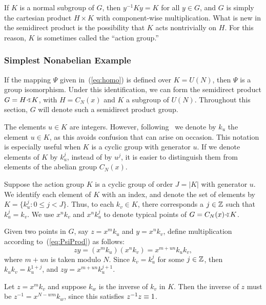 If $K$ is a normal subgroup of $G$,
then $y^{-1}Ky = K$ for all $y\in G$, 
and $G$ is simply the cartesian product $H\times K$ 
with component-wise multiplication. 
What is new in the semidirect product is
the possibility that $K$ acts nontrivially on $H$. 
For this reason, $K$ is sometimes called the ``action group.''

\subsubsection{Simplest Nonabelian Example}
If the mapping $\Psi$ given in~(\ref{eq:homo}) is defined over
$K=U(N)$, then $\Psi$ is a group isomorphism.
Under this identification, we can form the semidirect
product $G = H\sdp K$, with $H = C_N(x)$ and $K$ a
subgroup of $U(N)$.  Throughout this section, $G$ will
denote such a semidirect product group.

The elements $u\in K$ are integers. However, following~\cite{An:2003} we
denote by $k_u$ the element $u\in K$, as this avoids confusion that can arise 
on occasion. This notation is especially useful when $K$ 
is a cyclic group with generator $u$.  If  we denote elements of $K$ by $k_u^j$, instead of 
by $u^j$, it is easier to distinguish them from elements of the abelian group $C_N(x)$.

Suppose the action group $K$ is a cyclic group of order $J = |K|$ with generator
$u$. We identify each element of $K$ with an index, and denote 
the set of elements by $K = \{k_u^j: 0\leq j < J\}$.
Thus, to each $k_v \in K$, there corresponds a $j\in \mathbb{Z}$ 
such that $k_u^j=k_v$.
We use $x^n k_v$ and $x^n k_u^j$ to denote  
typical points of $G=C_N(x)\sdp K$.

Given two points in $G$, say $z = x^m k_u$
and $y=x^n k_v$, define multiplication %
according
to~(\ref{eq:PsiProd}) as follows:
\begin{equation}\label{eq:prod}
  zy = (x^m k_u)(x^n k_v) = x^{m+u n} k_u k_v,
\end{equation}
where %
$m+ u n$ is taken modulo $N$.
Since $k_v=k_u^j$ for some $j\in \mathbb{Z}$, then 
$k_u k_v = k_u^{1+j}$, and $zy = x^{m+u n} k_u^{j+1}$.

Let $z = x^m k_v$ and suppose $k_w$ is the inverse 
of $k_v$ in $K$.  Then the inverse of $z$ must be
$z^{-1}=x^{N-wm} k_w$, since this satisfies
$z^{-1}z \equiv 1$.

